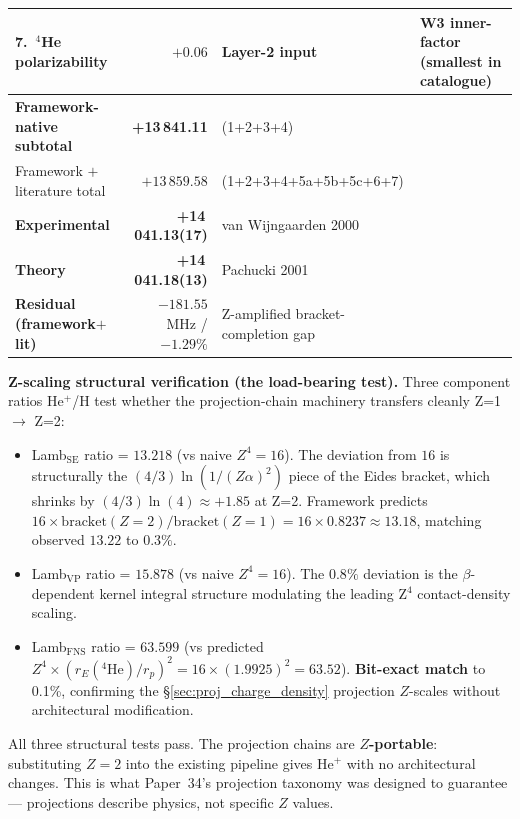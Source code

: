 \documentclass[11pt]{article}
\begin{document}
\begin{table}[h!]
\begin{tabular}{p{5.5cm} r p{4.7cm} l}
7.~${}^4$He polarizability & $+0.06$ &
Layer-2 input & W3 inner-factor (smallest in catalogue) \\
\midrule
\textbf{Framework-native subtotal} & \textbf{+13\,841.11} & (1+2+3+4) & \\
Framework $+$ literature total & $+13\,859.58$ & (1+2+3+4+5a+5b+5c+6+7) & \\
\textbf{Experimental} & \textbf{+14\,041.13(17)} & van Wijngaarden 2000 & \\
\textbf{Theory} & \textbf{+14\,041.18(13)} & Pachucki 2001 & \\
\textbf{Residual (framework$+$lit)} & $\mathbf{-181.55}$ MHz / $-1.29\%$
& Z-amplified bracket-completion gap & \\
\bottomrule
\end{tabular}
\end{table}

\textbf{Z-scaling structural verification (the load-bearing test).}
Three component ratios He$^+$/H test whether the projection-chain
machinery transfers cleanly Z=1 $\to$ Z=2:

\begin{itemize}\setlength\itemsep{0pt}
\item Lamb$_\text{SE}$ ratio = $13.218$ (vs naive $Z^4 = 16$).  The
deviation from $16$ is structurally the $(4/3) \ln(1/(Z\alpha)^2)$
piece of the Eides bracket, which shrinks by $(4/3) \ln(4) \approx
+1.85$ at Z=2.  Framework predicts $16 \times \text{bracket}(Z=2)/
\text{bracket}(Z=1) = 16 \times 0.8237 \approx 13.18$, matching observed
$13.22$ to $0.3\%$.

\item Lamb$_\text{VP}$ ratio = $15.878$ (vs naive $Z^4 = 16$).  The
$0.8\%$ deviation is the $\beta$-dependent kernel integral structure
modulating the leading Z$^4$ contact-density scaling.

\item Lamb$_\text{FNS}$ ratio = $63.599$ (vs predicted $Z^4 \times
(r_E({}^4\text{He})/r_p)^2 = 16 \times (1.9925)^2 = 63.52$).
\textbf{Bit-exact match} to 0.1\%, confirming the
\S\ref{sec:proj_charge_density} projection $Z$-scales without
architectural modification.
\end{itemize}

All three structural tests pass.  The projection chains are
\textbf{$Z$-portable}: substituting $Z=2$ into the existing pipeline
gives He$^+$ with no architectural changes.  This is what Paper~34's
projection taxonomy was designed to guarantee --- projections describe
physics, not specific $Z$ values.
\end{document}
